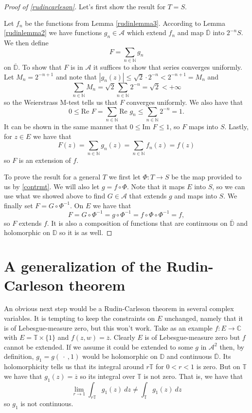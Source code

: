 \documentclass[a4paper,12pt,twoside,BCOR=10mm]{scrbook}
\theoremstyle{definition}
\theoremstyle{definition}
\theoremstyle{definition}
\renewcommand{\Re}{\text{Re }}
\renewcommand{\Im}{\text{Im }}
\begin{document}
\begin{proof}[Proof of \ref{rudincarleson}]
Let's first show the result for $T = S$.

Let $f_n$ be the functions from Lemma \ref{rudinlemma3}.
According to Lemma \ref{rudinlemma2} we have functions $g_n \in \mathcal{A}$ which extend $f_n$ and map $\overline{\mathbb{D}}$ into $2^{-n}S$.
We then define
\[
	F = \sum_{n \in \mathbb{N}} g_n
\]
on $\overline{\mathbb{D}}$.
To show that $F$ is in $\mathcal{A}$ it suffices to show that series converges uniformly.
Let $M_n = 2^{-n + 1}$ and note that $|g_n(z)| \leq \sqrt{2}\cdot 2^{-n} < 2^{-n + 1} = M_n$ and
\[
	\sum_{n \in \mathbb{N}} M_n
	=
	\sqrt{2}\sum_{n \in \mathbb{N}} 2^{-n} =
	\sqrt{2} < +\infty
\]
so the Weierstrass M-test tells us that $F$ converges uniformly.
We also have that
\[
	0 \leq \Re F = \sum_{n \in \mathbb{N}} \Re g_n \leq \sum_{n \in \mathbb{N}} 2^{-n} = 1.
\]
It can be shown in the same manner that $0 \leq \Im F \leq 1$, so $F$ maps into $S$.
Lastly, for $z \in E$ we have that
\[
	F(z) = \sum_{n \in \mathbb{N}} g_n(z) = \sum_{n \in \mathbb{N}} f_n(z) = f(z)
\]
so $F$ is an extension of $f$.

To prove the result for a general $T$ we first let $\Phi: T \rightarrow S$ be the map provided to us by \ref{contrmt}.
We will also let $g = f \circ \Phi$.
Note that it maps $E$ into $S$, so we can use what we showed above to find $G \in \mathcal{A}$ that extends $g$ and maps into $S$.
We finally set $F = G \circ \Phi^{-1}$.
On $E$ we have that
\[
	F = G \circ \Phi^{-1} = g \circ \Phi^{-1} = f \circ \Phi \circ \Phi^{-1} = f,
\]
so $F$ extends $f$.
It is also a composition of functions that are continuous on $\overline{\mathbb{D}}$ and holomorphic on $\mathbb{D}$ so it is as well.
\end{proof}



\section{A generalization of the Rudin-Carleson theorem}
\label{section3}
An obvious next step would be a Rudin-Carleson theorem in several complex variables.
It is tempting to keep the constraints on $E$ unchanged, namely that it is of Lebesgue-measure zero, but this won't work.
Take as an example $f: E \rightarrow \mathbb{C}$ with $E = \mathbb{T} \times \{1\}$ and $f(z, w) = \overline{z}$.
Clearly $E$ is of Lebesgue-measure zero but $f$ cannot be extended.
If we assume it could be extended to some $g$ in $\mathcal{A}^2$ then, by definition, $g_1 = g(\ \cdot \ , 1)$ would be holomorphic on $\mathbb{D}$ and continuous $\overline{\mathbb{D}}$.
Its holomorphicity tells us that its integral around $r\mathbb{T}$ for $0 < r < 1$ is zero.
But on $\mathbb{T}$ we have that $g_1(z) = \overline{z}$ so its integral over $\mathbb{T}$ is not zero.
That is, we have that
\[
	\lim_{r \rightarrow 1} \int_{r\mathbb{T}} g_1(z)\ dz \neq \int_{\mathbb{T}} g_1(z)\ dz
\]
so $g_1$ is not continuous.
\end{document}
